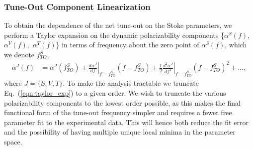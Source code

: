 \documentclass[%
 amsmath,amssymb,
aps,
]{revtex4-2}
\newcommand{\derivn}[3][{}]{
    \frac{d^{#1} #2}{d #3^{#1}}
}
\newcommand{\difn}[3]{\frac{d^#3 #1}{d #2^#3}}
\begin{document}
 \subsubsection{Tune-Out Component Linearization}
To obtain the dependence of the net tune-out on the Stoke parameters, we perform a Taylor expansion on the dynamic polarizability components \{\(\alpha^S(f)\),\, \(\alpha^V(f)\),\, \(\alpha^T(f)\)\} in terms of frequency about the zero point of \(\alpha^S(f)\), which we denote \(f^{S}_{TO}\),
\begin{align}
    \alpha^J(f) &= \alpha^J(f^{S}_{TO}) + \left. \derivn{\alpha^J}{f}{{}}\right|_{f=f^{S}_{TO}} (f-f^{S}_{TO}) +\frac{1}{2}\left. \difn{\alpha^J}{f}{2}\right|_{f=f^{S}_{TO}}(f-f^{S}_{TO})^2 + ...,\label{eqn:taylor_exp}
\end{align}
where \(J=\{S,V,T\}\). To make the analysis tractable we truncate Eq.~(\ref{eqn:taylor_exp}) to a given order. We wish to truncate the various polarizability components to the lowest order possible, as this makes the final functional form of the tune-out frequency simpler and requires a fewer free parameter fit to the experimental data. This will hence both reduce the fit error and the possibility of having multiple unique local minima in the parameter space.
\end{document}
